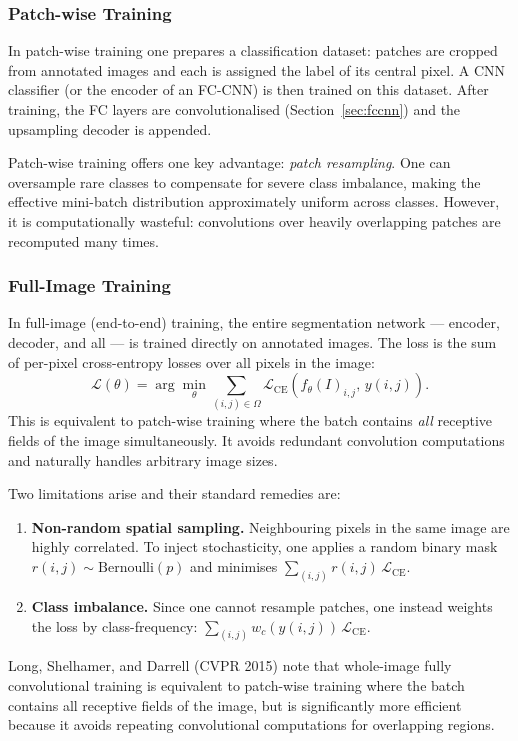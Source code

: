 \documentclass[11pt,a4paper]{article}
\begin{document}
\subsubsection{Patch-wise Training}

In patch-wise training one prepares a classification dataset: patches are cropped from annotated images and each is assigned the label of its central pixel. A CNN classifier (or the encoder of an FC-CNN) is then trained on this dataset. After training, the FC layers are convolutionalised (Section~\ref{sec:fccnn}) and the upsampling decoder is appended.

Patch-wise training offers one key advantage: \emph{patch resampling}. One can oversample rare classes to compensate for severe class imbalance, making the effective mini-batch distribution approximately uniform across classes. However, it is computationally wasteful: convolutions over heavily overlapping patches are recomputed many times.

\subsubsection{Full-Image Training}

In full-image (end-to-end) training, the entire segmentation network — encoder, decoder, and all — is trained directly on annotated images. The loss is the sum of per-pixel cross-entropy losses over all pixels in the image:
\[
  \mathcal{L}(\theta) = \arg\min_\theta \sum_{(i,j)\in\Omega} \mathcal{L}_{\text{CE}}\!\left(f_\theta(I)_{i,j},\, y(i,j)\right).
\]
This is equivalent to patch-wise training where the batch contains \emph{all} receptive fields of the image simultaneously. It avoids redundant convolution computations and naturally handles arbitrary image sizes.

Two limitations arise and their standard remedies are:
\begin{enumerate}
  \item \textbf{Non-random spatial sampling.} Neighbouring pixels in the same image are highly correlated. To inject stochasticity, one applies a random binary mask $r(i,j) \sim \text{Bernoulli}(p)$ and minimises $\sum_{(i,j)} r(i,j)\,\mathcal{L}_{\text{CE}}$.
  \item \textbf{Class imbalance.} Since one cannot resample patches, one instead weights the loss by class-frequency: $\sum_{(i,j)} w_c(y(i,j))\,\mathcal{L}_{\text{CE}}$.
\end{enumerate}

\begin{notebox}
Long, Shelhamer, and Darrell (CVPR 2015) note that whole-image fully convolutional training is equivalent to patch-wise training where the batch contains all receptive fields of the image, but is significantly more efficient because it avoids repeating convolutional computations for overlapping regions.
\end{notebox}
\end{document}
